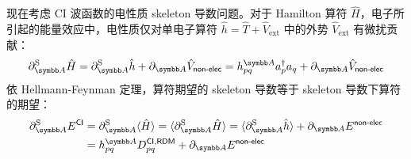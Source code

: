 现在考虑 CI 波函数的电性质 skeleton 导数问题。对于 Hamilton 算符 $\hat H$，电子所引起的能量效应中，电性质仅对单电子算符 $\hat h = \hat T + \hat V_\mathrm{ext}$ 中的外势 $\hat V_\mathrm{ext}$ 有微扰贡献：
\begin{equation}
    \partial_\mathbb{A}^\mathrm{S} \hat H = \partial_\mathbb{A}^\mathrm{S} \hat h + \partial_\mathbb{A} \hat V_\textmt{non-elec} = h_{pq}^\mathbb{A} a_p^\dagger a_q + \partial_\mathbb{A} \hat V_\textmt{non-elec}
\end{equation}
依 Hellmann-Feynman 定理，算符期望的 skeleton 导数等于 skeleton 导数下算符的期望：
\begin{align}
    \partial_\mathbb{A}^\mathrm{S} E^\textmt{CI} &= \partial_\mathbb{A}^\mathrm{S} \langle \hat H \rangle = \langle \partial_\mathbb{A}^\mathrm{S} \hat H \rangle = \langle \partial_\mathbb{A}^\mathrm{S} \hat h \rangle + \partial_\mathbb{A} E^\textmt{non-elec} \notag\\
    &= h_{pq}^\mathbb{A} D_{pq}^{\textmt{CI}, \textmt{RDM}} + \partial_\mathbb{A} E^\textmt{non-elec}
\end{align}

